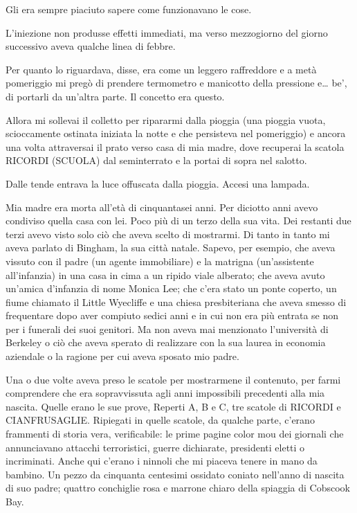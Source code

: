 Gli era sempre piaciuto sapere come funzionavano le cose.

\separatorefiori

L'iniezione non produsse effetti immediati, ma verso mezzogiorno del
giorno successivo aveva qualche linea di febbre.

Per quanto lo riguardava, disse, era come un leggero raffreddore e a
metà pomeriggio mi pregò di prendere termometro e manicotto della
pressione e\ldots{} be', di portarli da un'altra parte. Il concetto era
questo.

Allora mi sollevai il colletto per ripararmi dalla pioggia (una pioggia
vuota, scioccamente ostinata iniziata la notte e che persisteva nel
pomeriggio) e ancora una volta attraversai il prato verso casa di mia
madre, dove recuperai la scatola {RICORDI} ({SCUOLA}) dal seminterrato e
la portai di sopra nel salotto.

Dalle tende entrava la luce offuscata dalla pioggia. Accesi una lampada.

Mia madre era morta all'età di cinquantasei anni. Per diciotto anni
avevo condiviso quella casa con lei. Poco più di un terzo della sua
vita. Dei restanti due terzi avevo visto solo ciò che aveva scelto di
mostrarmi. Di tanto in tanto mi aveva parlato di Bingham, la sua città
natale. Sapevo, per esempio, che aveva vissuto con il padre (un agente
immobiliare) e la matrigna (un'assistente all'infanzia) in una casa in
cima a un ripido viale alberato; che aveva avuto un'amica d'infanzia di
nome Monica Lee; che c'era stato un ponte coperto, un fiume chiamato il
Little Wyecliffe e una chiesa presbiteriana che aveva smesso di
frequentare dopo aver compiuto sedici anni e in cui non era più entrata
se non per i funerali dei suoi genitori. Ma non aveva mai menzionato
l'università di Berkeley o ciò che aveva sperato di realizzare con la
sua laurea in economia aziendale o la ragione per cui aveva sposato mio
padre.

Una o due volte aveva preso le scatole per mostrarmene il contenuto, per
farmi comprendere che era sopravvissuta agli anni impossibili precedenti
alla mia nascita. Quelle erano le sue prove, Reperti A, B e C, tre
scatole di {RICORDI} e {CIANFRUSAGLIE}. Ripiegati in quelle scatole, da
qualche parte, c'erano frammenti di storia vera, verificabile: le prime
pagine color mou dei giornali che annunciavano attacchi terroristici,
guerre dichiarate, presidenti eletti o incriminati. Anche qui c'erano i
ninnoli che mi piaceva tenere in mano da bambino. Un pezzo da cinquanta
centesimi ossidato coniato nell'anno di nascita di suo padre; quattro
conchiglie rosa e marrone chiaro della spiaggia di Cobscook Bay.

